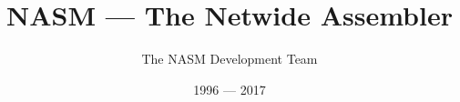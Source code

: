 \documentclass[oneside,openany]{book}
\begin{document}
\title{NASM --- The Netwide Assembler}
\date{1996 --- 2017}
\author{The NASM Development Team}

\maketitle
\tableofcontents
{}

%





\printindex
\end{document}
